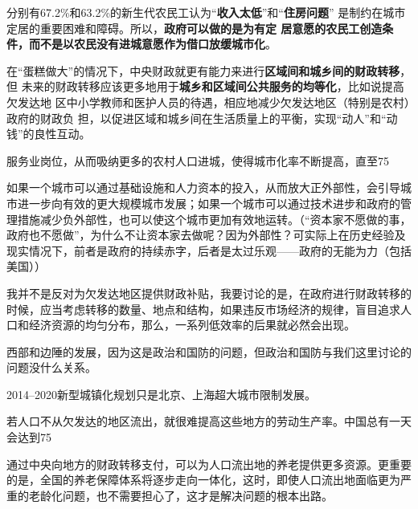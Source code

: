 分别有67.2\%和63.2\%的新生代农民工认为“{\bf 收入太低}”和“{\bf 住房问题}”
          是制约在城市定居的重要困难和障碍。所以，{\bf 政府可以做的是为有定
          居意愿的农民工创造条件，而不是以农民没有进城意愿作为借口放缓城市化}。

在“蛋糕做大”的情况下，中央财政就更有能力来进行{\bf 区域间和城乡间的财政转移}，但
未来的财政转移应该更多地用于{\bf 城乡和区域间公共服务的均等化}，比如说提高欠发达地
区中小学教师和医护人员的待遇，相应地减少欠发达地区（特别是农村）政府的财政负
担，以促进区域和城乡间在生活质量上的平衡，实现“动人”和“动钱”的良性互动。

服务业岗位，从而吸纳更多的农村人口进城，使得城市化率不断提高，直至75%


如果一个城市可以通过基础设施和人力资本的投入，从而放大正外部性，会引导城市进一步向有效的更大规模城市发展；如果一个城市可以通过技术进步和政府的管理措施减少负外部性，也可以使这个城市更加有效地运转。（“资本家不愿做的事，政府也不愿做”，为什么不让资本家去做呢？因为外部性？可实际上在历史经验及现实情况下，前者是政府的持续赤字，后者是太过乐观——政府的无能为力（包括美国））

我并不是反对为欠发达地区提供财政补贴，我要讨论的是，在政府进行财政转移的时候，应当考虑转移的数量、地点和结构，如果违反市场经济的规律，盲目追求人口和经济资源的均匀分布，那么，一系列低效率的后果就必然会出现。

西部和边陲的发展，因为这是政治和国防的问题，但政治和国防与我们这里讨论的问题没什么关系。

2014--2020新型城镇化规划只是北京、上海超大城市限制发展。

若人口不从欠发达的地区流出，就很难提高这些地方的劳动生产率。中国总有一天会达到75%

通过中央向地方的财政转移支付，可以为人口流出地的养老提供更多资源。更重要的是，全国的养老保障体系将逐步走向一体化，这时，即使人口流出地面临更为严重的老龄化问题，也不需要担心了，这才是解决问题的根本出路。

